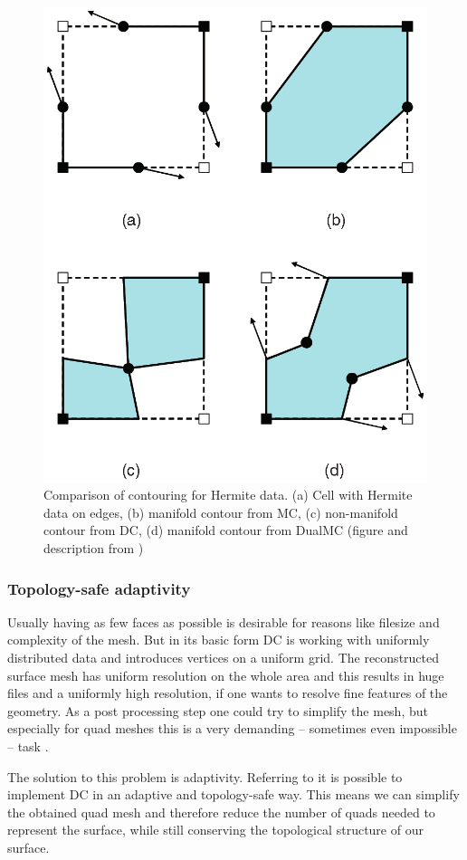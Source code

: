 \begin{figure}
\begin{center}
\includegraphics[width=.3 \textwidth]{Pictures/SurfaceReconstruction/ManifoldDC.png}
\end{center}
\caption{Comparison of contouring for Hermite data. (a) Cell with Hermite data on edges, (b) manifold contour from \acs{MC}, (c) non-manifold contour from \acs{DC}, (d) manifold contour from \acs{DualMC} (figure and description from \cite{Schaefer2007})}
\label{fig:manifold}
\end{figure}

\subsubsection{Topology-safe adaptivity}
Usually having as few faces as possible is desirable for reasons like filesize and complexity of the mesh. But in its basic form \ac{DC} is working with uniformly distributed data and introduces vertices on a uniform grid. The reconstructed surface mesh has uniform resolution on the whole area and this results in huge files and a uniformly high resolution, if one wants to resolve fine features of the geometry. As a post processing step one could try to simplify the mesh, but especially for \ac{quad} meshes this is a very demanding -- sometimes even impossible -- task \cite{Puppo2010}.

The solution to this problem is adaptivity. Referring to \cite{Hermite2002} it is possible to implement \ac{DC} in an adaptive and topology-safe way. This means we can simplify the obtained \ac{quad} mesh and therefore reduce the number of \acp{quad} needed to represent the surface, while still conserving the topological structure of our surface.
